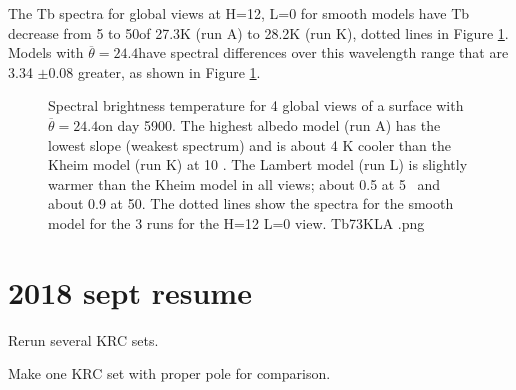 \documentclass{article}
\begin{document}
 The Tb spectra for global views at H=12, L=0 for smooth models have Tb decrease
 from 5 to 50\um of 27.3K (run A) to 28.2K (run K), dotted lines in Figure
 \ref{Tb73KLA}.  Models with $\overline{\theta}=24.4$\qd have spectral
 differences over this wavelength range that are 3.34 $\pm$0.08 greater, as
 shown in Figure \ref{Tb73KLA}.

\begin{figure}[!ht] 
\caption[Global Tb]{Spectral brightness temperature for 4 global views of a
  surface with $\overline{\theta}=24.4$\qd on day 5900. The highest albedo model
  (run A) has the lowest slope (weakest spectrum) and is about 4 K cooler than
  the Kheim model (run K) at 10 \um. The Lambert model (run L) is slightly
  warmer than the Kheim model in all views; about 0.5 at 5\um~ and about 0.9 at
  50\um. The dotted lines show the spectra for the smooth model for the 3 runs
  for the H=12 L=0 view.
\label{Tb73KLA} Tb73KLA .png  }
\end{figure} 

 \section{2018 sept resume}

Rerun several KRC sets. 

Make one KRC set with proper pole for comparison.
\end{document}

